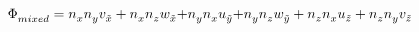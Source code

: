 \documentclass{minimal}
\begin{document}
 $
\Phi _{mixed}^{} = n_x^{}n_y^{}v_{\tilde x}^{} + n_x^{}n_z^{}w_{\tilde x}^{}{\rm{        +    }}n_y^{}n_x^{}u_{\tilde y}^{}{\rm{ + }}n_y^{}n_z^{}w_{\tilde y}^{}{\rm{   }} + {\rm{  }}n_z^{}n_x^{}u_{\tilde z}^{} + n_z^{}n_y^{}v_{\tilde z}^{}
 $
 
\end{document}
